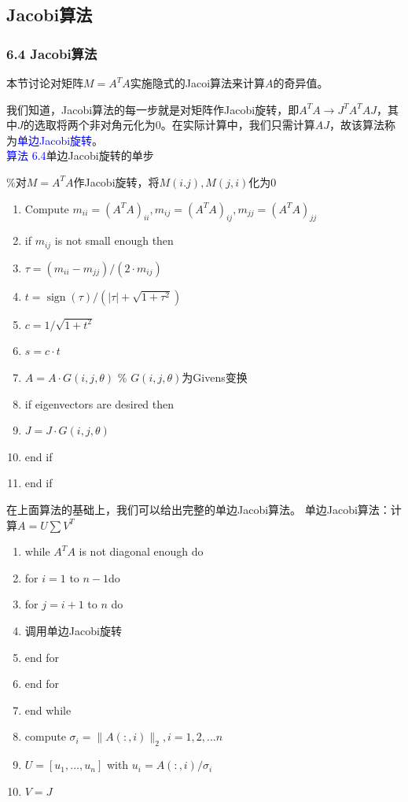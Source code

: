 \documentclass[notheorems,serif]{beamer}
\begin{document}
\subsection*{Jacobi算法}
\begin{frame}
\frametitle{6.4 \qquad Jacobi算法}


本节讨论对矩阵$M=A^TA$实施隐式的Jacoi算法来计算$A$的奇异值。

我们知道，Jacobi算法的每一步就是对矩阵作Jacobi旋转，即$A^TA\rightarrow J^TA^TAJ$，其中$J$的选取将两个非对角元化为0。在实际计算中，我们只需计算$AJ$，故该算法称为\textcolor{blue}{单边Jacobi旋转}。\\
\textcolor{blue}{算法 6.4}\quad 单边Jacobi旋转的单步

\%对$M=A^TA$作Jacobi旋转，将$M(i.j),M(j,i)$化为0
\end{frame}
\begin{frame}

\begin{enumerate}[1:]
	\item Compute $m_{ii}=(A^TA)_{ii},m_{ij}=(A^TA)_{ij},m_{jj}=(A^TA)_{jj}$
	\item if $m_{ij}$ is not small enough then 
	\item \quad $\tau=\left(m_{i i}-m_{j j}\right) / \left(2 \cdot m_{i j}\right)$
	\item \quad $t=\operatorname{sign}(\tau) /\left(|\tau|+\sqrt{1+\tau^{2}}\right)$
	\item \quad $c=1 / \sqrt{1+t^{2}}$
	\item \quad $s=c\cdot t$
	\item \quad $A=A\cdot G(i, j, \theta)$ \qquad \% $G(i,j,\theta)$为Givens变换
	\item \quad if eigenvectors are desired then
	\item \qquad $J=J\cdot G(i, j, \theta)$
	\item \quad end if
	\item end if
\end{enumerate}
\end{frame}
\begin{frame}
在上面算法的基础上，我们可以给出完整的单边Jacobi算法。
\quad 单边Jacobi算法：计算$A=U\sum V^T$
\begin{enumerate}[1:]
	\item while $A^TA$ is not diagonal enough do
	\item \quad for $i=1$ to $n-1$do
	\item \qquad for $j=i+1$ to $n$ do
	\item \qquad \quad 调用单边Jacobi旋转
	\item \qquad end for 
	\item \quad end for 
	\item end while 
	\item compute $\sigma_{i}=\|A( :, i)\|_{2}, i=1,2, \ldots n$
	\item $U=\left[u_{1}, \dots, u_{n}\right]$ with $u_{i}=A( :, i) / \sigma_{i}$
	\item $V=J$
\end{enumerate}
\end{frame}
\end{document}
